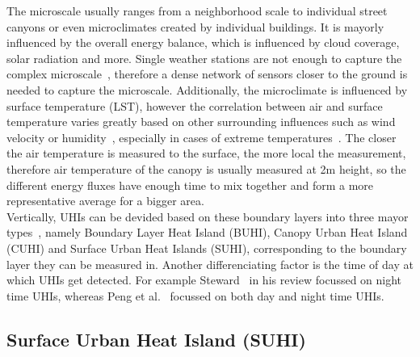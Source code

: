 The microscale usually ranges from a neighborhood scale to individual street canyons or even microclimates created by individual buildings. It is mayorly influenced by the overall energy balance, which is influenced by cloud coverage, solar radiation and more. Single weather stations are not enough to capture the complex microscale~\cite{oke2004siting}, therefore a dense network of sensors closer to the ground is needed to capture the microscale. Additionally, the microclimate is influenced by surface temperature (LST), however the correlation between air and surface temperature varies greatly based on other surrounding influences such as wind velocity or humidity~\cite{stoll1992surface}, especially in cases of extreme temperatures~\cite{good2016situ}. The closer the air temperature is measured to the surface, the more local the measurement, therefore air temperature of the canopy is usually measured at 2m height, so the different energy fluxes have enough time to mix together and form a more representative average for a bigger area.\\
Vertically, UHIs can be devided based on these boundary layers into three mayor types~\cite{oke1976distinction, oke2017urban}, namely Boundary Layer Heat Island (BUHI), Canopy Urban Heat Island (CUHI) and Surface Urban Heat Islands (SUHI), corresponding to the boundary layer they can be measured in. Another differenciating factor is the time of day at which UHIs get detected. For example Steward~\cite{stewart2011systematic} in his review focussed on night time UHIs, whereas Peng et al.~\cite{peng2012surface} focussed on both day and night time UHIs.

\subsection{Surface Urban Heat Island (SUHI)}

